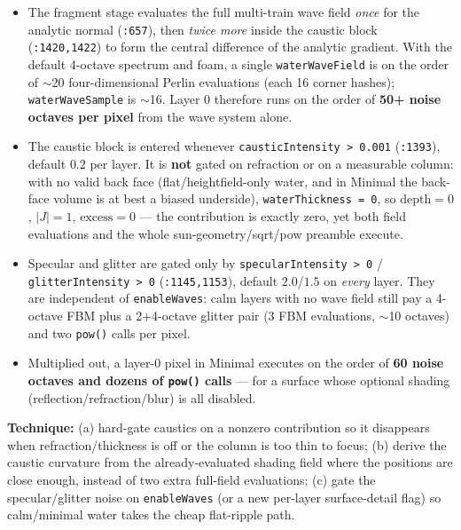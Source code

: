 \documentclass[11pt,a4paper]{article}
\begin{document}
\begin{itemize}
    \item The fragment stage evaluates the full multi-train wave field \emph{once} for the analytic normal (\texttt{:657}), then \emph{twice more} inside the caustic block
    (\texttt{:1420,1422}) to form the central difference of the analytic gradient. With the default 4-octave spectrum and foam, a single \texttt{waterWaveField} is on the order
    of $\sim$20 four-dimensional Perlin evaluations (each 16 corner hashes); \texttt{waterWaveSample} is $\sim$16. Layer 0 therefore runs on the order of \textbf{50+ noise
    octaves per pixel} from the wave system alone.
    \item The caustic block is entered whenever \texttt{causticIntensity > 0.001} (\texttt{:1393}), default $0.2$ per layer. It is \textbf{not} gated on refraction or on a
    measurable column: with no valid back face (flat/heightfield-only water, and in Minimal the back-face volume is at best a biased underside), \texttt{waterThickness = 0},
    so $\mathrm{depth}=0$, $|J| = 1$, $\mathrm{excess}=0$ --- the contribution is exactly zero, yet both field evaluations and the whole sun-geometry/sqrt/pow preamble execute.
    \item Specular and glitter are gated only by \texttt{specularIntensity > 0} / \texttt{glitterIntensity > 0} (\texttt{:1145,1153}), default $2.0$/$1.5$ on \emph{every}
    layer. They are independent of \texttt{enableWaves}: calm layers with no wave field still pay a 4-octave FBM plus a 2$+$4-octave glitter pair (3 FBM evaluations,
    $\sim$10 octaves) and two \texttt{pow()} calls per pixel.
    \item Multiplied out, a layer-0 pixel in Minimal executes on the order of \textbf{60 noise octaves and dozens of \texttt{pow()} calls} --- for a surface whose optional
    shading (reflection/refraction/blur) is all disabled.
\end{itemize}

\textbf{Technique:} (a) hard-gate caustics on a nonzero contribution so it disappears when refraction/thickness is off or the column is too thin to focus; (b) derive the
caustic curvature from the already-evaluated shading field where the positions are close enough, instead of two extra full-field evaluations; (c) gate the specular/glitter
noise on \texttt{enableWaves} (or a new per-layer surface-detail flag) so calm/minimal water takes the cheap flat-ripple path.
\end{document}
